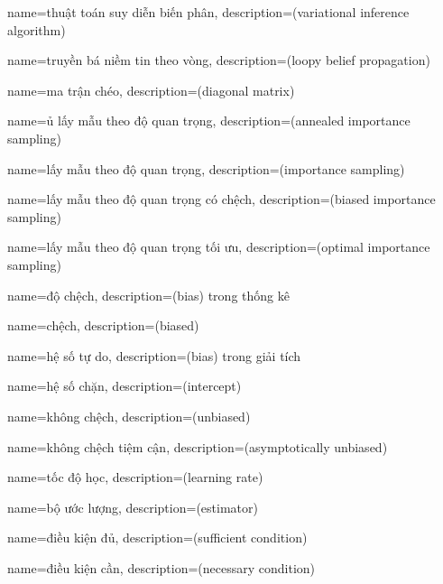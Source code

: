 {
    name={thuật toán suy diễn biến phân},
    description={(variational inference algorithm)}
}

{
    name={truyền bá niềm tin theo vòng},
    description={(loopy belief propagation)}
}

{
    name={ma trận chéo},
    description={(diagonal matrix)}
}

{
    name={ủ lấy mẫu theo độ quan trọng},
    description={(annealed importance sampling)}
}


{
    name={lấy mẫu theo độ quan trọng},
    description={(importance sampling)}
}

{
    name={lấy mẫu theo độ quan trọng có chệch},
    description={(biased importance sampling)}
}

{
    name={lấy mẫu theo độ quan trọng tối ưu},
    description={(optimal importance sampling)}
}

{
    name={độ chệch},
    description={(bias) trong thống kê}
}

{
    name={chệch},
    description={(biased)}
}

{
    name={hệ số tự do},
    description={(bias) trong giải tích}
}

{
    name={hệ số chặn},
    description={(intercept)}
}

{
    name={không chệch},
    description={(unbiased)}
}

{
    name={không chệch tiệm cận},
    description={(asymptotically unbiased)}
}

{
    name={tốc độ học},
    description={(learning rate)}
}

{
    name={bộ ước lượng},
    description={(estimator)}
}

{
    name={điều kiện đủ},
    description={(sufficient condition)}
}

{
    name={điều kiện cần},
    description={(necessary condition)}
}


